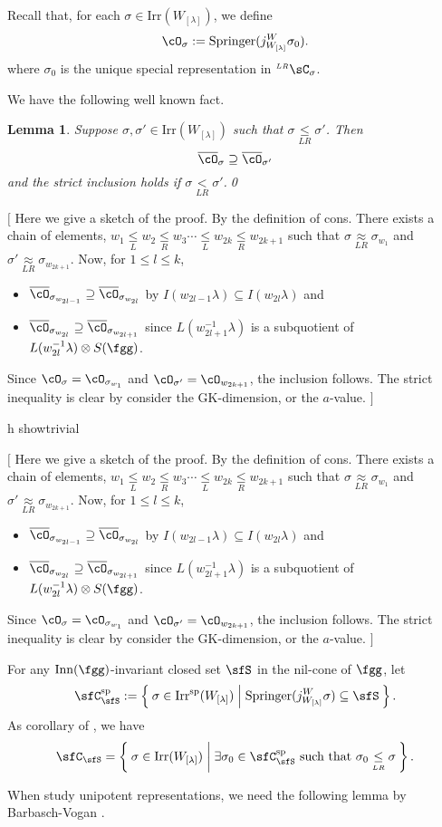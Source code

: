 \documentclass[12pt,a4paper]{amsart}
\newcommand{\trivial}[2][]{\if\relax\detokenize{#1}\relax
  {%
      \color{orange} \vspace{0em} $[$  #2 $]$
      \color{black}
  }
  \else
\ifx#1h
\ifcsname showtrivial\endcsname
{%
    \color{orange} \vspace{0em}  $[$ #2 $]$
    \color{black}
}
\fi
\else {\red Wrong argument!} \fi
\fi
}
\numberwithin{equation}{section}
\newtheorem{lem}[thm]{Lemma}
\theoremstyle{remark}
\def\Irr{\mathrm{Irr}}
\def\Irrsp{\mathrm{Irr}^{\text{sp}}}
\def\Gad{\Inn(\fgg)}
\def\Wlam{W_{[\lambda]}}
\def\WLam{W_{\Lam}}
\def\LRC{{}^{\scriptscriptstyle LR}\sC}
\def\Spr{\mathrm{Springer}}
\def\Csp{\sfC^{\text{sp}}}
\def\lneqLR{\mathrel{\mathop{<}\limits_{\scriptscriptstyle LR}}}
\def\leqL{\mathrel{\mathop{\leq}\limits_{\scriptscriptstyle L}}}
\def\leqR{\mathrel{\mathop{\leq}\limits_{\scriptscriptstyle R}}}
\def\leqLR{\mathrel{\mathop{\leq}\limits_{\scriptscriptstyle LR}}}
\def\approxLR{\mathrel{\mathop{\approx}\limits_{\scriptscriptstyle LR}}}
\def\Inn{\mathrm{Inn}}
\newcommand{\Lam}{{[\lambda]}}
\begin{document}
Recall that, for each $\sigma\in \Irr(\WLam)$, we define
\[
  \cO_{\sigma}:= \Spr(j_{\WLam}^{W}\sigma_{0}).
\]
where $\sigma_{0}$ is the unique special representation in $\LRC_{\sigma}$.

We have the following well known fact. %
\begin{lem}\label{lem:LRorbit}
  Suppose $\sigma,\sigma'\in \Irr(\Wlam)$ such that $\sigma\leqLR \sigma'$. Then
  \[
    \bcO_{\sigma} \supseteq \bcO_{\sigma'}
  \]
  and the strict inclusion holds if $\sigma\lneqLR \sigma'$.\qed
\end{lem}
\trivial[]{ Here we give a sketch of the proof. By the definition of cons. There
  exists a chain of elements,
  $w_{1}\leqL w_{2}\leqR w_{3}\cdots \leqL w_{2k} \leqR w_{2k+1} $ such that
  $\sigma \approxLR \sigma_{w_{1}}$ and $\sigma'\approxLR \sigma_{w_{2k+1}}$. Now, for
  $1\leq l\leq k$,
  \begin{itemize}
    \item $\bcO_{\sigma_{w_{2l-1}}}\supseteq \bcO_{\sigma_{w_{2l}}}$ by
          $I(w_{2l-1}\lambda)\subseteq I(w_{2l}\lambda)$ and
    \item $\bcO_{\sigma_{w_{2l}}}\supseteq \bcO_{\sigma_{w_{2l+1}}}$ since
    $L(w^{-1}_{2l+1}\lambda)$ is a subquotient of
     $L(w^{-1}_{2l}\lambda)\otimes S(\fgg)$.
  \end{itemize}
  Since $\cO_{\sigma} = \cO_{\sigma_{w_{1}}}$ and
  $\cO_{\sigma'} = \cO_{w_{2k+1}}$, the inclusion follows.
  The strict inequality is clear by consider the GK-dimension, or the $a$-value. }


  For any $\Gad$-invariant closed set $\sfS$ in the nil-cone of $\fgg$, let
  \begin{equation}\label{eq:C.S}
      \Csp_{\sfS} := \Set{\sigma \in \Irrsp(\WLam)| \Spr(j_{\WLam}^{W}\sigma)\subseteq \sfS}. \\
  \end{equation}
  As  corollary of , we have
\[
  \sfC_{\sfS} = \Set{\sigma\in \Irr(\Wlam)|
    \exists \sigma_{0} \in \Csp_{\sfS}
    \text{ such that } \sigma_{0} \leqLR \sigma}.
\]



When study unipotent representations, we need the following lemma by
Barbasch-Vogan \cite{BVUni}.


\end{document}
